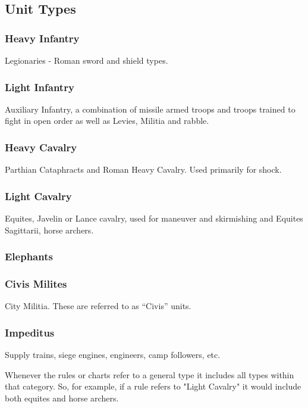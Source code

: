 \subsection{Unit Types}

\subsubsection{Heavy Infantry}

Legionaries - Roman sword and shield types.

\subsubsection{Light Infantry}

Auxiliary Infantry, a combination of missile armed troops and troops trained to fight in open order as well as Levies, Militia and rabble.

\subsubsection{Heavy Cavalry}

Parthian Cataphracts and Roman Heavy Cavalry. Used primarily for shock.

\subsubsection{Light Cavalry}

Equites, Javelin or Lance cavalry, used for maneuver and skirmishing and Equites Sagittarii, horse archers.

\subsubsection{Elephants}

\subsubsection{Civis Milites}

City Militia. These are referred to as “Civis” units.

\subsubsection{Impeditus}

Supply trains, siege engines, engineers, camp followers, etc.

Whenever the rules or charts refer to a general type it includes all types within that category. So, for example, if a rule refers to "Light Cavalry" it would include both equites and horse archers.

